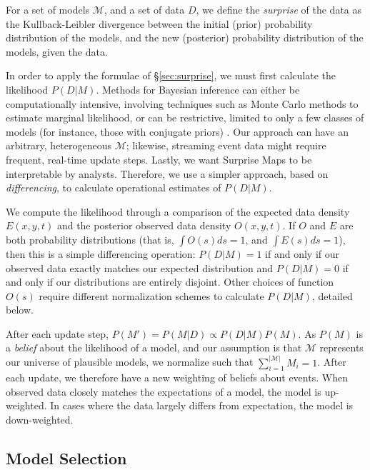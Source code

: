 \documentclass[journal]{vgtc}                %
\begin{document}
For a set of models $\mathcal{M}$, and a set of data $D$, we define the \emph{surprise} of the data as the Kullback-Leibler divergence between the initial (prior) probability distribution of the models, and the new (posterior) probability distribution of the models, given the data.

In order to apply the formulae of \S\ref{sec:surprise}, we must first calculate the likelihood $P(D|M)$. Methods for Bayesian inference can either be computationally intensive, involving techniques such as Monte Carlo methods to estimate marginal likelihood, or can be restrictive, limited to only a few classes of models (for instance, those with conjugate priors) \cite{box2011bayesian}. Our approach can have an arbitrary, heterogeneous $\mathcal{M}$; likewise, streaming event data might require frequent, real-time update steps. Lastly, we want Surprise Maps to be interpretable by analysts. Therefore, we use a simpler approach, based on \emph{differencing}, to calculate operational estimates of $P(D|M)$.

We compute the likelihood through a comparison of the expected data density $E(x,y,t)$ and the posterior observed data density $O(x,y,t)$. If $O$ and $E$ are both probability distributions (that is, $\int O(s)ds=1$, and $\int E(s)ds=1$), then this is a simple differencing operation: $P(D|M)=1 $ if and only if our observed data exactly matches our expected distribution and $P(D|M)=0$ if and only if our distributions are entirely disjoint. Other choices of function $O(s)$ require different normalization schemes to calculate $P(D|M)$, detailed below.

After each update step, $P(M') = P(M|D) \propto P(D|M)P(M)$. As $P(M)$ is a \emph{belief} about the likelihood of a model, and our assumption is that $\mathcal{M}$ represents our universe of plausible models, we normalize such that $\sum_{i=1}^{|\mathcal{M}|} M_i =1$. After each update, we therefore have a new weighting of beliefs about events. When observed data closely matches the expectations of a model, the model is up-weighted. In cases where the data largely differs from expectation, the model is down-weighted.



\subsection{Model Selection}
\label{sec:models}
\end{document}
